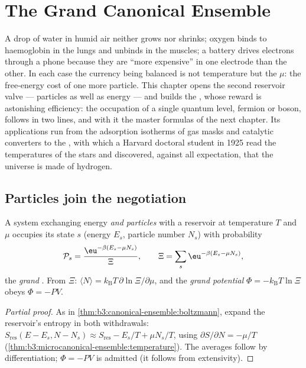 \chapter{The Grand Canonical Ensemble}\label{ch:b3:grand-canonical}

A drop of water in humid air neither grows nor shrinks; oxygen
binds to haemoglobin in the lungs and unbinds in the muscles; a
battery drives electrons through a phone because they are ``more
expensive'' in one electrode than the other. In each case the
currency being balanced is not temperature but the \emph{} $\mu$: the free-energy cost of one more particle. This
chapter opens the second reservoir valve --- particles as well as
energy --- and builds the , whose reward is
astonishing efficiency: the occupation of a single quantum level,
fermion or boson, follows in two lines, and with it the master
formulas of the next chapter. Its applications run from the
adsorption isotherms of gas masks and catalytic converters to the
, with which a Harvard doctoral student in 1925 read
the temperatures of the stars and discovered, against all
expectation, that the universe is made of hydrogen.

\section{Particles join the negotiation}

\begin{theorem}\label{thm:b3:grand-canonical:distribution}
A system exchanging energy \emph{and particles} with a reservoir at
temperature $T$ and  $\mu$ occupies its state $s$
(energy $E_s$, particle number $N_s$) with probability
\[
\mathcal P_s = \frac{\eu^{-\beta(E_s - \mu N_s)}}{\Xi} , \qquad
\Xi = \sum_s\eu^{-\beta(E_s - \mu N_s)} ,
\]
the \emph{grand }. From $\Xi$: $\langle N\rangle
= k_{\text{B}}T\,\partial\ln\Xi/\partial\mu$, and the \emph{grand
potential} $\Phi = -k_{\text{B}}T\ln\Xi$ obeys $\Phi = -PV$.
\end{theorem}

\begin{proof}[Partial proof]
As in \cref{thm:b3:canonical-ensemble:boltzmann}, expand the
reservoir's entropy in both withdrawals:
$S_{\text{res}}(E - E_s, N - N_s) \approx S_{\text{res}} - E_s/T +
\mu N_s/T$, using $\partial S/\partial N = -\mu/T$
(\cref{thm:b3:microcanonical-ensemble:temperature}). The averages
follow by differentiation; $\Phi = -PV$ is admitted (it follows
from extensivity).
\end{proof}

